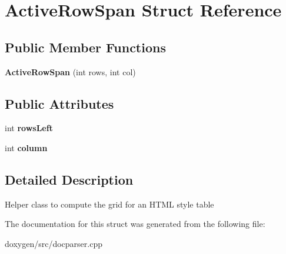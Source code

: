 \hypertarget{struct_active_row_span}{}\section{Active\+Row\+Span Struct Reference}
\label{struct_active_row_span}
\subsection*{Public Member Functions}
\begin{DoxyCompactItemize}
\item 
\mbox{\label{struct_active_row_span_a32f572774256d921c310c5c134e6f8f8}} 
{\bfseries Active\+Row\+Span} (int rows, int col)
\end{DoxyCompactItemize}
\subsection*{Public Attributes}
\begin{DoxyCompactItemize}
\item 
\mbox{\label{struct_active_row_span_a5500562d0cb80ec523f6a48e8469e251}} 
int {\bfseries rows\+Left}
\item 
\mbox{\label{struct_active_row_span_ab190ef70644400cd0fb5f51ac99800b3}} 
int {\bfseries column}
\end{DoxyCompactItemize}


\subsection{Detailed Description}
Helper class to compute the grid for an H\+T\+ML style table 

The documentation for this struct was generated from the following file\+:\begin{DoxyCompactItemize}
\item 
doxygen/src/docparser.\+cpp\end{DoxyCompactItemize}
